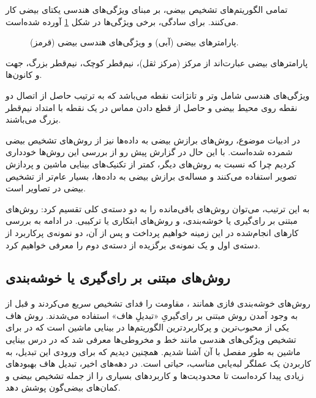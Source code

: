 \documentclass[12pt,a4paper]{article}
\numberwithin{equation}{section}
\numberwithin{figure}{section}
\theoremstyle{definition}
\theoremstyle{theorem}
\theoremstyle{definition}
\begin{document}
تمامی الگوریتم‌های تشخیص بیضی، بر مبنای ویژگی‌های هندسی یکتای بیضی کار می‌کنند. برای سادگی، برخی ویژگی‌ها در شکل \ref{fig:ellipse} آورده شده‌است. 

\begin{figure}[h]
\centering
{}
\caption{پارامترهای بیضی (آبی) و ویژگی‌های هندسی بیضی (قرمز)\cite{survey}. }
\label{fig:ellipse}
\end{figure}

پارامترهای بیضی عبارت‌اند از مرکز (مرکز ثقل)، نیم‌قطر کوچک، نیم‌قطر بزرگ، جهت و کانون‌ها. 

ویژگی‌های هندسی شامل وتر و تانژانت نقطه می‌باشد که به ترتیب حاصل از اتصال دو نقطه‌ روی محیط بیضی و حاصل از قطع دادن مماس در یک نقطه با امتداد نیم‌قطر بزرگ می‌باشند. 

در ادبیات موضوع، روش‌های برازش بیضی به داده‌ها نیز از روش‌های تشخیص بیضی شمرده شده‌است. با این حال در گزارش پیش رو از بررسی این روش‌ها خودداری کردیم چرا که نسبت به روش‌های دیگر،‌ کمتر از تکنیک‌های بینایی ماشین و پردازش تصویر استفاده می‌کنند و مساله‌ی برازش بیضی به داده‌ها، بسیار عام‌تر از تشخیص بیضی در تصاویر است.

به این ترتیب، می‌توان روش‌های باقی‌مانده را به دو دسته‌ی کلی تقسیم کرد: روش‌های مبتنی بر رای‌گیری یا خوشه‌بندی، و روش‌های ابتکاری یا ترکیبی. در ادامه به بررسی کارهای انجام‌شده در این زمینه خواهیم پرداخت و پس از آن، دو نمونه‌ی پرکاربرد از دسته‌ی اول و یک نمونه‌ی برگزیده از دسته‌ی دوم را معرفی خواهیم کرد. 

\subsection{روش‌های مبتنی بر رای‌گیری یا خوشه‌بندی}


روش‌های خوشه‌بندی فازی همانند \cite{fuzzy}، مقاومت را فدای تشخیص سریع می‌کردند و قبل از به وجود آمدن روش مبتنی بر رای‌گیریِ «تبدیلِ هاف» استفاده می‌شدند. روش هاف یکی از محبوب‌ترین و پرکاربردترین الگوریتم‌ها در بینایی ماشین است که در \cite{hough} برای تشخیص ویژگی‌های هندسی مانند خط و مخروطی‌ها معرفی شد که در درس بینایی ماشین به طور مفصل با آن آشنا شدیم. همچنین دیدیم که برای ورودی این تبدیل، به کاربردن یک عملگر لبه‌یابی مناسب، حیاتی است. در دهه‌های اخیر، تبدیل هاف بهبودهای زیادی پیدا کرده‌است تا محدودیت‌ها و کاربردهای بسیاری را از جمله تشخیص بیضی و کمان‌های بیضی‌گون پوشش دهد. 
\end{document}
